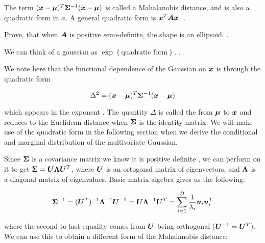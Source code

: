 \begin{tcolorbox}
    The term $({\bm{x}} - {\bm{\mu}})^T {\bm{\Sigma}}^{-1}({\bm{x}} - {\bm{\mu}})$ is called a Mahalanobis distance, and is also a quadratic form in $x$. A general quadratic form is ${\bm{x}}^T {\bm{A}} {\bm{x}}$. .
    
    Prove, that when ${\bm{A}}$ is positive semi-definite, the shape is an ellipsoid. .
    
    We can think of a gaussian as $\exp{\left\{ \text{quadratic form} \right\} }$. . .
    
        
    We note here that the functional dependence of the Gaussian on ${\bm{x}}$ is through the quadratic form
    
    \begin{equation}
    \Delta^2 = ({\bm{x}} - {\bm{\mu}})^T {\bm{\Sigma}}^{-1} ({\bm{x}} - {\bm{\mu}})
    \end{equation}
    
    which appears in the exponent \citep{bishop2016pattern} . The quantity $\Delta$ is called the  from ${\bm{\mu}}$ to ${\bm{x}}$ and reduces to the Euclidean distance when ${\bm{\Sigma}}$ is the identity matrix. We will make use of the quadratic form in the following section when we derive the conditional and marginal distribution of the multivariate Gaussian.
    
    Since ${\bm{\Sigma}}$ is a covariance matrix we know it is positive definite , we can perform  on it to get ${\bm{\Sigma}} = {\bm{U}} {\bm{\Lambda}} {\bm{U}}^T$, where ${\bm{U}}$ is an ortogonal matrix of eigenvectors, and ${\bm{\Lambda}}$ is a diagonal matrix of eigenvalues. Basic matrix algebra gives us the following:
    
    \begin{equation}
    {\bm{\Sigma}}^{-1} = ({\bm{U}}^T)^{-1} {\bm{\Lambda}}^{-1} {\bm{U}}^{-1} = {\bm{U}} {\bm{\Lambda}}^{-1} {\bm{U}}^T = \sum_{i = 1}^D \frac{1}{\lambda_i} {\bm{u}}_i {\bm{u}}_i^T
    \end{equation}
    
    where the second to last equality comes from ${\bm{U}}$ being orthogonal (${\bm{U}}^{-1} = {\bm{U}}^T$). We can use this to obtain a different form of the Mahalanobis distance: 
    

\end{tcolorbox}
